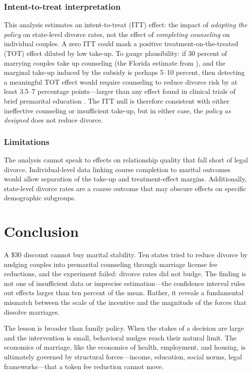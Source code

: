 \documentclass[12pt]{article}
\begin{document}
\subsubsection*{Intent-to-treat interpretation} This analysis estimates an intent-to-treat (ITT) effect: the impact of \textit{adopting the policy} on state-level divorce rates, not the effect of \textit{completing counseling} on individual couples. A zero ITT could mask a positive treatment-on-the-treated (TOT) effect diluted by low take-up. To gauge plausibility: if 30 percent of marrying couples take up counseling (the Florida estimate from \citet{stanley2006strengthening}), and the marginal take-up induced by the subsidy is perhaps 5--10 percent, then detecting a meaningful TOT effect would require counseling to reduce divorce risk by at least 3.5--7 percentage points---larger than any effect found in clinical trials of brief premarital education \citep{markman2010preventing}. The ITT null is therefore consistent with either ineffective counseling or insufficient take-up, but in either case, the \textit{policy as designed} does not reduce divorce.

\subsubsection*{Limitations} The analysis cannot speak to effects on relationship quality that fall short of legal divorce. Individual-level data linking course completion to marital outcomes would allow separation of the take-up and treatment-effect margins. Additionally, state-level divorce rates are a coarse outcome that may obscure effects on specific demographic subgroups.


\section{Conclusion}

A \$30 discount cannot buy marital stability. Ten states tried to reduce divorce by nudging couples into premarital counseling through marriage license fee reductions, and the experiment failed: divorce rates did not budge. The finding is not one of insufficient data or imprecise estimation---the confidence interval rules out effects larger than ten percent of the mean. Rather, it reveals a fundamental mismatch between the scale of the incentive and the magnitude of the forces that dissolve marriages.

The lesson is broader than family policy. When the stakes of a decision are large and the intervention is small, behavioral nudges reach their natural limit. The economics of marriage, like the economics of health, employment, and housing, is ultimately governed by structural forces---income, education, social norms, legal frameworks---that a token fee reduction cannot move.
\end{document}
